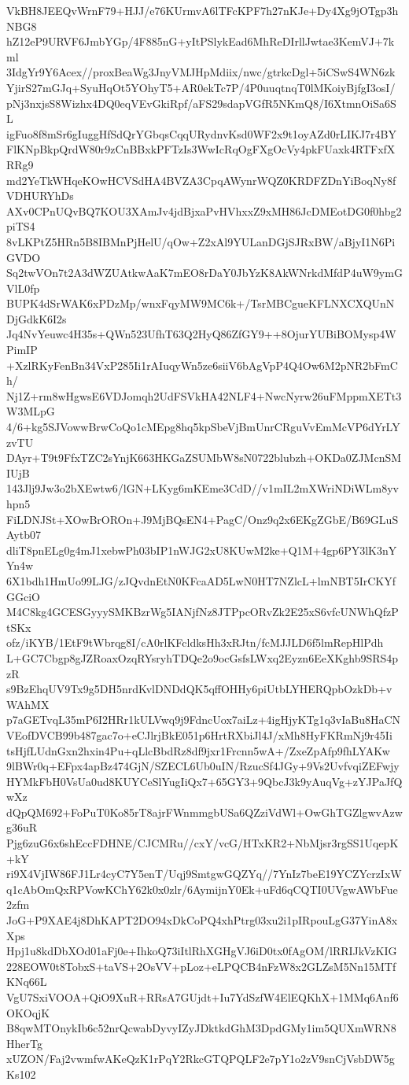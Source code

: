 VkBH8JEEQvWrnF79+HJJ/e76KUrmvA6lTFcKPF7h27nKJe+Dy4Xg9jOTgp3hNBG8
hZ12eP9URVF6JmbYGp/4F885nG+yItPSlykEad6MhReDIrllJwtae3KemVJ+7kml
3IdgYr9Y6Acex//proxBeaWg3JnyVMJHpMdiix/nwc/gtrkcDgl+5iCSwS4WN6zk
YjirS27mGJq+SyuHqOt5YOhyT5+AR0ekTc7P/4P0uuqtnqT0lMKoiyBjfgI3osI/
pNj3nxjsS8Wizhx4DQ0eqVEvGkiRpf/aFS29sdapVGfR5NKmQ8/I6XtmnOiSa6SL
igFuo8f8mSr6gIuggHfSdQrYGbqsCqqURydnvKsd0WF2x9t1oyAZd0rLIKJ7r4BY
FlKNpBkpQrdW80r9zCnBBxkPFTzIs3WwIcRqOgFXgOcVy4pkFUaxk4RTFxfXRRg9
md2YeTkWHqeKOwHCVSdHA4BVZA3CpqAWynrWQZ0KRDFZDnYiBoqNy8fVDHURYhDs
AXv0CPnUQvBQ7KOU3XAmJv4jdBjxaPvHVhxxZ9xMH86JcDMEotDG0f0hbg2piTS4
8vLKPtZ5HRn5B8IBMnPjHelU/qOw+Z2xAl9YULanDGjSJRxBW/aBjyI1N6PiGVDO
Sq2twVOn7t2A3dWZUAtkwAaK7mEO8rDaY0JbYzK8AkWNrkdMfdP4uW9ymGVlL0fp
BUPK4dSrWAK6xPDzMp/wnxFqyMW9MC6k+/TsrMBCgueKFLNXCXQUnNDjGdkK6I2s
Jq4NvYeuwc4H35s+QWn523UfhT63Q2HyQ86ZfGY9++8OjurYUBiBOMysp4WPimIP
+XzlRKyFenBn34VxP285Ii1rAIuqyWn5ze6siiV6bAgVpP4Q4Ow6M2pNR2bFmCh/
Nj1Z+rm8wHgwsE6VDJomqh2UdFSVkHA42NLF4+NwcNyrw26uFMppmXETt3W3MLpG
4/6+kg5SJVowwBrwCoQo1cMEpg8hq5kpSbeVjBmUnrCRguVvEmMcVP6dYrLYzvTU
DAyr+T9t9FfxTZC2sYnjK663HKGaZSUMbW8sN0722blubzh+OKDa0ZJMcnSMIUjB
143Jlj9Jw3o2bXEwtw6/lGN+LKyg6mKEme3CdD//v1mIL2mXWriNDiWLm8yvhpn5
FiLDNJSt+XOwBrOROn+J9MjBQsEN4+PagC/Onz9q2x6EKgZGbE/B69GLuSAytb07
dliT8pnELg0g4mJ1xebwPh03bIP1nWJG2xU8KUwM2ke+Q1M+4gp6PY3lK3nYYn4w
6X1bdh1HmUo99LJG/zJQvdnEtN0KFcaAD5LwN0HT7NZlcL+lmNBT5IrCKYfGGciO
M4C8kg4GCESGyyySMKBzrWg5IANjfNz8JTPpcORvZk2E25xS6vfcUNWhQfzPtSKx
ofz/iKYB/1EtF9tWbrqg8I/cA0rlKFcldksHh3xRJtn/fcMJJLD6f5lmRepHlPdh
L+GC7Cbgp8gJZRoaxOzqRYsryhTDQe2o9ocGsfsLWxq2Eyzn6EeXKghb9SRS4pzR
s9BzEhqUV9Tx9g5DH5nrdKvlDNDdQK5qffOHHy6piUtbLYHERQpbOzkDb+vWAhMX
p7aGETvqL35mP6I2HRr1kULVwq9j9FdncUox7aiLz+4igHjyKTg1q3vIaBu8HaCN
VEofDVCB99b487gac7o+eCJlrjBkE051p6HrtRXbiJl4J/xMh8HyFKRmNj9r45Ii
tsHjfLUdnGxn2hxin4Pu+qLlcBbdRz8df9jxr1Frcnn5wA+/ZxeZpAfp9fhLYAKw
9lBWr0q+EFpx4apBz474GjN/SZECL6Ub0uIN/RzucSf4JGy+9Vs2UvfvqiZEFwjy
HYMkFbH0VsUa0ud8KUYCeSlYugIiQx7+65GY3+9QbcJ3k9yAuqVg+zYJPaJfQwXz
dQpQM692+FoPuT0Ko85rT8ajrFWnmmgbUSa6QZziVdWl+OwGhTGZlgwvAzwg36uR
Pjg6zuG6x6shEccFDHNE/CJCMRu//cxY/vcG/HTxKR2+NbMjsr3rgSS1UqepK+kY
ri9X4VjIW86FJ1Lr4cyC7Y5enT/Uqj9SmtgwGQZYq//7YnIz7beE19YCZYcrzIxW
q1cAbOmQxRPVowKChY62k0x0zlr/6AymijnY0Ek+uFd6qCQTI0UVgwAWbFue2zfm
JoG+P9XAE4j8DhKAPT2DO94xDkCoPQ4xhPtrg03xu2i1pIRpouLgG37YinA8xXps
Hpj1u8kdDbXOd01aFj0e+IhkoQ73iItlRhXGHgVJ6iD0tx0fAgOM/lRRIJkVzKIG
228EOW0t8TobxS+taVS+2OsVV+pLoz+eLPQCB4nFzW8x2GLZsM5Nn15MTfKNq66L
VgU7SxiVOOA+QiO9XuR+RRsA7GUjdt+Iu7YdSzfW4ElEQKhX+1MMq6Anf6OKOqjK
B8qwMTOnykIb6c52nrQcwabDyvyIZyJDktkdGhM3DpdGMy1im5QUXmWRN8HherTg
xUZON/Faj2vwmfwAKeQzK1rPqY2RkcGTQPQLF2e7pY1o2zV9snCjVsbDW5gKs102
